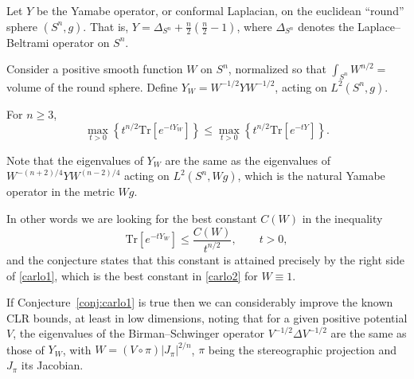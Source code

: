 \documentclass[12pt,letterpaper, reqno]{amsart}
\begin{document}
\begin{problemblock}
 Let $Y$ be the Yamabe operator, or conformal Laplacian, on the
euclidean ``round'' sphere $(S^n,g)$. That is, $Y = \Delta_{S^n} +
\frac{n}{2} \left( \frac{n}{2}-1 \right)$, where $\Delta_{S^n}$
denotes the Laplace--Beltrami operator on $S^n$.

Consider a positive smooth function $W$ on $S^n$, normalized so that
$\int_{S^n} W^{n/2}=$volume of the round sphere. Define
$Y_W=W^{-1/2}YW^{-1/2}$, acting on $L^2(S^n,g)$.

\begin{conjecture} \label{conj:carlo1}
 For $n \geq 3$,
%
\begin{equation} \label{carlo1}
\max_{t>0} \left\{ t^{n/2} \text{Tr}[e^{-tY_W}] \right\} \leq
\max_{t>0} \left\{ t^{n/2} \text{Tr}[e^{-tY}]   \right\} .
\end{equation}
\end{conjecture}

Note that the eigenvalues of $Y_W$ are the same as the eigenvalues
of $W^{-(n+2)/4}Y W^{(n-2)/4}$ acting on $L^2(S^n, W g)$, which is
the natural Yamabe operator in the metric $Wg$.

In other words we are looking for the best constant $C(W)$ in the
inequality
%
\begin{equation} \label{carlo2}
\text{Tr}[e^{-tY_W}] \leq \frac{C(W)}{t^{n/2}},  \qquad t>0,
\end{equation}
%
and the conjecture states that this constant is attained precisely
by the right side of \eqref{carlo1}, which is the best constant in
\eqref{carlo2} for $W \equiv 1$.


\begin{remark}
If Conjecture~\ref{conj:carlo1} is true then we can considerably improve the known
CLR bounds, at least in low dimensions, noting that for a given
positive potential $V$, the eigenvalues of the Birman--Schwinger
operator $V^{-1/2}\Delta V^{-1/2}$ are the same as those of $Y_W$,
with $W=(V\circ\pi) |J_\pi|^{2/n}$, $\pi$ being the stereographic
projection and $J_\pi$ its Jacobian.
\end{remark}
\end{problemblock}
\end{document}
